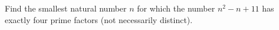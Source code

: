 Find the smallest natural number $n$ for which the number $n^2-n+11$ has exactly four prime factors (not necessarily distinct).